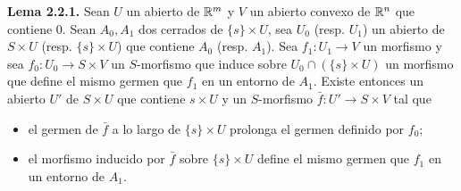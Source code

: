 \textbf{Lema 2.2.1.} Sean $U$ un abierto de $\mathbb R^m$ y $V$ un abierto convexo de $\mathbb R^n$ que contiene $0$. Sean $A_0,A_1$ dos cerrados de $\{s\}\times U$, sea $U_0$ (resp. $U_1$) un abierto de $S\times U$ (resp. $\{s\}\times U$) que contiene $A_0$ (resp. $A_1$). Sea $f_1:U_1\to V$ un morfismo y sea $f_0:U_0\to S\times V$ un $S$-morfismo que induce sobre $U_0\cap(\{s\}\times U)$ un morfismo que define el mismo germen que $f_1$ en un entorno de $A_1$. Existe entonces un abierto $U'$ de $S\times U$ que contiene $s\times U$ y un $S$-morfismo $\bar f:U'\longrightarrow S\times V$ tal que
\begin{itemize}
\item[(i)] el germen de $\bar f$ a lo largo de $\{s\}\times U$ prolonga el germen definido por $f_0$;
\item[(ii)] el morfismo inducido por $\bar f$ sobre $\{s\}\times U$ define el mismo germen que $f_1$ en un entorno de $A_1$.
\end{itemize}
